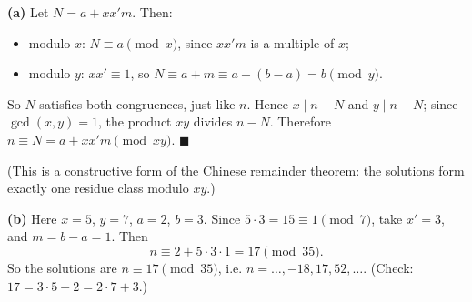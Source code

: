 \textbf{(a)} Let $N=a+xx'm$. Then:
\begin{itemize}
\item modulo $x$: $N\equiv a\pmod x$, since $xx'm$ is a multiple of $x$;
\item modulo $y$: $xx'\equiv1$, so $N\equiv a+m\equiv a+(b-a)=b\pmod y$.
\end{itemize}
So $N$ satisfies both congruences, just like $n$. Hence $x\mid n-N$ and $y\mid n-N$; since $\gcd(x,y)=1$, the product $xy$ divides $n-N$. Therefore $n\equiv N=a+xx'm\pmod{xy}$. $\blacksquare$

(This is a constructive form of the Chinese remainder theorem: the solutions form exactly one residue class modulo $xy$.)

\textbf{(b)} Here $x=5$, $y=7$, $a=2$, $b=3$. Since $5\cdot3=15\equiv1\pmod7$, take $x'=3$, and $m=b-a=1$. Then
\[n\equiv2+5\cdot3\cdot1=17\pmod{35}.\]
So the solutions are $\boxed{n\equiv17\pmod{35}}$, i.e. $n=\dots,-18,17,52,\dots$. (Check: $17=3\cdot5+2=2\cdot7+3$.)
